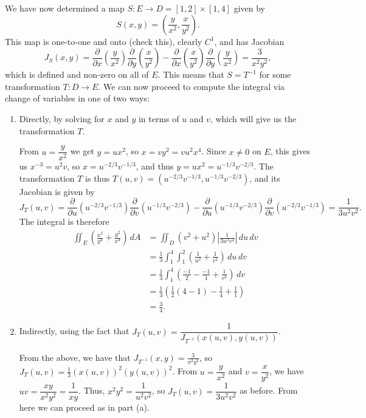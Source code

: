 {We have now determined a map $S:E\to D=[1,2]\times [1,4]$ given by
\[
S(x,y) = \left(\frac{y}{x^2}, \frac{x}{y^2}\right).
\]
This map is one-to-one and onto (check this), clearly $C^1$, and has Jacobian
\[
J_S(x,y) = \frac{\partial}{\partial x}\left(\frac{y}{x^2}\right)\frac{\partial}{\partial y}\left(\frac{x}{y^2}\right)-\frac{\partial}{\partial x}\left(\frac{x}{y^2}\right)\frac{\partial}{\partial y}\left(\frac{y}{x^2}\right)=\frac{3}{x^2y^2},
\]
which is defined and non-zero on all of $E$. This means that $S=T^{-1}$ for some transformation $T:D\to E$. We can now proceed to compute the integral via change of variables in one of two ways:
\begin{enumerate}
\item Directly, by solving for $x$ and $y$ in terms of $u$ and $v$, which will give us the transformation $T$.

\medskip

From $u=\dfrac{y}{x^2}$ we get $y=ux^2$, so $x=vy^2 = vu^2x^4$. Since $x\neq 0$ on $E$, this gives us $x^{-3} = u^2v$, so $x = u^{-2/3}v^{-1/3}$, and thus $y=ux^2 = u^{-1/3}v^{-2/3}$. The transformation $T$ is thus $T(u,v) = (u^{-2/3}v^{-1/3},u^{-1/3}v^{-2/3})$, and its Jacobian is given by
\[
J_T(u,v) = \frac{\partial}{\partial u}(u^{-2/3}v^{-1/3})\frac{\partial}{\partial v}(u^{-1/3}v^{-2/3})-\frac{\partial}{\partial u}(u^{-1/3}v^{-2/3})\frac{\partial}{\partial v}(u^{-2/3}v^{-1/3})=\frac{1}{3u^2v^2}.
\]
The integral is therefore
\begin{align*}
\iint_E\left(\frac{x^2}{y^4}+\frac{y^2}{x^4}\right)\,dA & = \iint_D\left(v^2+u^2\right)\left| \frac{1}{3u^2v^2}\right|\,du\,dv\\
& = \frac{1}{3}\int_1^4\int_1^2 \left(\frac{1}{u^2}+\frac{1}{v^2}\right)\,du\,dv\\
& = \frac{1}{3}\int_1^4\left(\frac{-1}{2}-\frac{-1}{1} +\frac{1}{v^2}\right)\, dv\\
& = \frac{1}{3}\left(\frac{1}{2}(4-1)-\frac{1}{4}+\frac{1}{1}\right)\\
& = \frac{3}{4}.
\end{align*}

\item Indirectly, using the fact that $J_T(u,v) = \dfrac{1}{J_{T^{-1}}(x(u,v),y(u,v))}$.

\medskip

From the above, we have that $J_{T^{-1}}(x,y) = \frac{3}{x^2y^2}$, so $J_T(u,v) = \frac{1}{3}(x(u,v))^2(y(u,v))^2$. From $u=\dfrac{y}{x^2}$ and $v=\dfrac{x}{y^2}$, we have $uv = \dfrac{xy}{x^2y^2} = \dfrac{1}{xy}$. Thus, $x^2y^2 = \dfrac{1}{u^2v^2}$, so $J_T(u,v) = \dfrac{1}{3u^2v^2}$ as before. From here we can proceed as in part (a).
\end{enumerate}}\\

